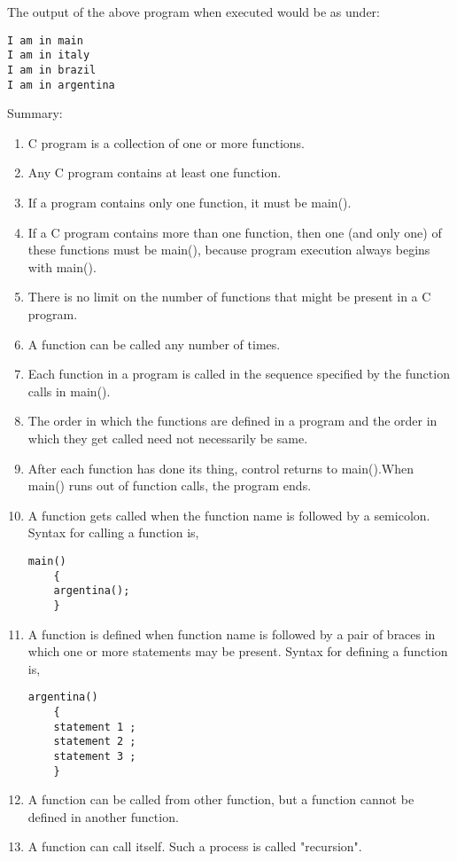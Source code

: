 The output of the above program when executed would be as under:
\begin{lstlisting}[style=CStyle]
I am in main
I am in italy
I am in brazil
I am in argentina
\end{lstlisting}

Summary:
\begin{enumerate}
    \item C program is a collection of one or more functions.
    \item Any C program contains at least one function.
    \item If a program contains only one function, it must be main().
    \item If a C program contains more than one function, then one (and only one) of these functions must be main(), because program execution always begins with main().
    \item There is no limit on the number of functions that might be present in a C program.
    \item A function can be called any number of times.
    \item Each function in a program is called in the sequence specified by the function calls in main().
    \item The order in which the functions are defined in a program and the order in which they get called need not necessarily be same.
    \item After each function has done its thing, control returns to main().When main() runs out of function calls, the program ends.
    \item A function gets called when the function name is followed by a semicolon. Syntax for calling a function is,
    \begin{lstlisting}[style=CStyle]
    main()
    {
    argentina();
    }
    \end{lstlisting}
    \item A function is defined when function name is followed by a pair of braces in which one or more statements may be present. Syntax for defining a function is,
    \begin{lstlisting}[style=CStyle]
    argentina()
    {
    statement 1 ;
    statement 2 ;
    statement 3 ;
    }
    \end{lstlisting}
    \item A function can be called from other function, but a function cannot be defined in another function.
    \item A function can call itself. Such a process is called "recursion".

\end{enumerate}
